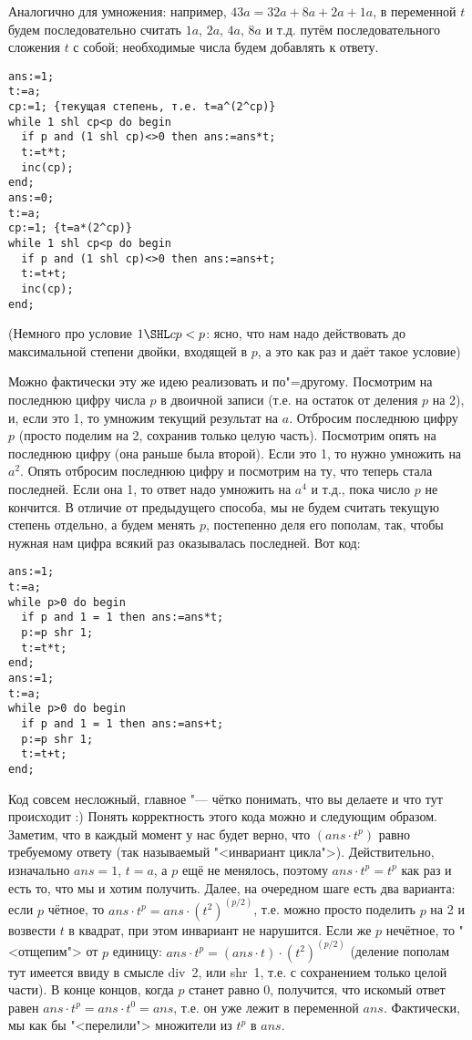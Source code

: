 {\small Аналогично для умножения: например, $43a=32a+8a+2a+1a$, в переменной $t$ будем 
последовательно считать $1a$, $2a$, $4a$, $8a$ и т.д. путём последовательного сложения $t$ с собой; 
необходимые числа будем добавлять к ответу.

}

\begin{codesample}\begin{verbatim}
ans:=1;
t:=a;
cp:=1; {текущая степень, т.е. t=a^(2^cp)}
while 1 shl cp<p do begin
  if p and (1 shl cp)<>0 then ans:=ans*t;
  t:=t*t;
  inc(cp);
end;
ans:=0;
t:=a;
cp:=1; {t=a*(2^cp)}
while 1 shl cp<p do begin
  if p and (1 shl cp)<>0 then ans:=ans+t;
  t:=t+t;
  inc(cp);
end;
\end{verbatim}
\end{codesample}
(Немного про условие $1 \SHL cp<p$: ясно, что нам надо действовать до максимальной степени двойки, 
входящей в $p$, а это как раз и даёт такое условие)

Можно фактически эту же идею реализовать и по"=другому. 
Посмотрим на последнюю цифру числа $p$ в двоичной записи (т.е. на остаток от деления $p$ на 2), 
и, если это 1, то умножим текущий результат на $a$. Отбросим последнюю цифру $p$
(просто поделим на 2, сохранив только целую часть). Посмотрим опять на последнюю цифру (она раньше была второй). 
Если это 1, то нужно умножить на $a^2$. 
Опять отбросим последнюю цифру и посмотрим на ту, что теперь стала последней. Если она 1, то 
ответ надо умножить на $a^4$ и т.д., пока число $p$ не кончится. В отличие от предыдущего способа, 
мы не будем считать текущую степень отдельно, а будем менять $p$, постепенно деля его пополам, так, 
чтобы нужная нам цифра всякий раз оказывалась последней.
Вот код:

\begin{codesample}\begin{verbatim}
ans:=1;
t:=a;
while p>0 do begin
  if p and 1 = 1 then ans:=ans*t;
  p:=p shr 1;
  t:=t*t;
end;
ans:=1;
t:=a;
while p>0 do begin
  if p and 1 = 1 then ans:=ans+t;
  p:=p shr 1;
  t:=t+t;
end;
\end{verbatim}
\end{codesample}

Код совсем несложный, главное "--- чётко понимать, что вы делаете и что тут происходит :) 
Понять корректность этого кода можно и следующим образом. Заметим, что в каждый 
момент у нас будет верно, что $(ans\cdot t^p)$ равно требуемому ответу (так называемый 
"<инвариант цикла">). Действительно, изначально $ans=1$, 
$t=a$, а $p$ ещё не менялось, поэтому $ans\cdot t^p=t^p$ как раз и есть то, что мы и хотим 
получить. Далее, на очередном шаге есть два варианта: если $p$ чётное, то 
$ans\cdot t^p=ans\cdot (t^2)^{(p/2)}$, т.е. можно просто поделить $p$ на 2 и возвести $t$ в квадрат, при 
этом инвариант не нарушится. Если же $p$ нечётное, то "<отщепим"> от $p$ единицу: 
$ans\cdot t^p=(ans\cdot t)\cdot (t^2)^{(p/2)}$ (деление пополам тут имеется ввиду в смысле 
div~2, или shr~1, т.е. с сохранением только целой части). В конце концов, когда $p$ станет равно 0, получится, что 
искомый ответ равен $ans\cdot t^p=ans\cdot t^0=ans$, т.е. он уже лежит в переменной $ans$. 
Фактически, мы как бы "<перелили"> множители из $t^p$ в $ans$.

